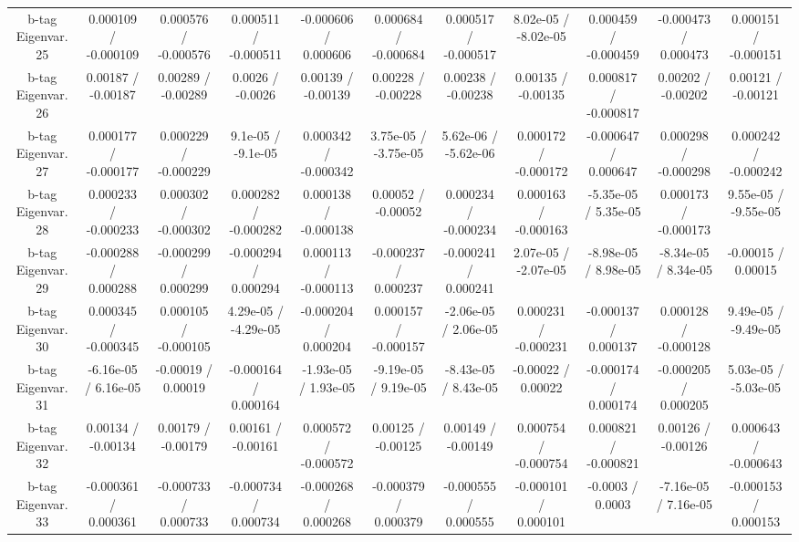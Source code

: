 \begin{table}[htbp]
\begin{center}
\begin{tabular}{|c|c|c|c|c|c|c|c|c|c|c|}
  b-tag Eigenvar. 25 & 0.000109 / -0.000109 & 0.000576 / -0.000576 & 0.000511 / -0.000511 & -0.000606 / 0.000606 & 0.000684 / -0.000684 & 0.000517 / -0.000517 & 8.02e-05 / -8.02e-05 & 0.000459 / -0.000459 & -0.000473 / 0.000473 & 0.000151 / -0.000151 \\ 
  b-tag Eigenvar. 26 & 0.00187 / -0.00187 & 0.00289 / -0.00289 & 0.0026 / -0.0026 & 0.00139 / -0.00139 & 0.00228 / -0.00228 & 0.00238 / -0.00238 & 0.00135 / -0.00135 & 0.000817 / -0.000817 & 0.00202 / -0.00202 & 0.00121 / -0.00121 \\ 
  b-tag Eigenvar. 27 & 0.000177 / -0.000177 & 0.000229 / -0.000229 & 9.1e-05 / -9.1e-05 & 0.000342 / -0.000342 & 3.75e-05 / -3.75e-05 & 5.62e-06 / -5.62e-06 & 0.000172 / -0.000172 & -0.000647 / 0.000647 & 0.000298 / -0.000298 & 0.000242 / -0.000242 \\ 
  b-tag Eigenvar. 28 & 0.000233 / -0.000233 & 0.000302 / -0.000302 & 0.000282 / -0.000282 & 0.000138 / -0.000138 & 0.00052 / -0.00052 & 0.000234 / -0.000234 & 0.000163 / -0.000163 & -5.35e-05 / 5.35e-05 & 0.000173 / -0.000173 & 9.55e-05 / -9.55e-05 \\ 
  b-tag Eigenvar. 29 & -0.000288 / 0.000288 & -0.000299 / 0.000299 & -0.000294 / 0.000294 & 0.000113 / -0.000113 & -0.000237 / 0.000237 & -0.000241 / 0.000241 & 2.07e-05 / -2.07e-05 & -8.98e-05 / 8.98e-05 & -8.34e-05 / 8.34e-05 & -0.00015 / 0.00015 \\ 
  b-tag Eigenvar. 30 & 0.000345 / -0.000345 & 0.000105 / -0.000105 & 4.29e-05 / -4.29e-05 & -0.000204 / 0.000204 & 0.000157 / -0.000157 & -2.06e-05 / 2.06e-05 & 0.000231 / -0.000231 & -0.000137 / 0.000137 & 0.000128 / -0.000128 & 9.49e-05 / -9.49e-05 \\ 
  b-tag Eigenvar. 31 & -6.16e-05 / 6.16e-05 & -0.00019 / 0.00019 & -0.000164 / 0.000164 & -1.93e-05 / 1.93e-05 & -9.19e-05 / 9.19e-05 & -8.43e-05 / 8.43e-05 & -0.00022 / 0.00022 & -0.000174 / 0.000174 & -0.000205 / 0.000205 & 5.03e-05 / -5.03e-05 \\ 
  b-tag Eigenvar. 32 & 0.00134 / -0.00134 & 0.00179 / -0.00179 & 0.00161 / -0.00161 & 0.000572 / -0.000572 & 0.00125 / -0.00125 & 0.00149 / -0.00149 & 0.000754 / -0.000754 & 0.000821 / -0.000821 & 0.00126 / -0.00126 & 0.000643 / -0.000643 \\ 
  b-tag Eigenvar. 33 & -0.000361 / 0.000361 & -0.000733 / 0.000733 & -0.000734 / 0.000734 & -0.000268 / 0.000268 & -0.000379 / 0.000379 & -0.000555 / 0.000555 & -0.000101 / 0.000101 & -0.0003 / 0.0003 & -7.16e-05 / 7.16e-05 & -0.000153 / 0.000153 \\ 

\end{tabular}
\end{center}
\end{table}
